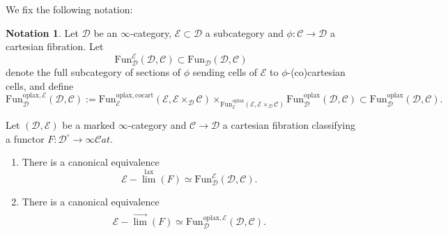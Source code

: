 \documentclass[10pt,oneside]{article}
\numberwithin{equation}{section} %
\numberwithin{figure}{section} %
\theoremstyle{plain}
\theoremstyle{definition}
\newtheorem{notation}[thm]{Notation}
\newcommand{\mC}{{\mathcal C}}
\newcommand{\mD}{{\mathcal D}}
\newcommand{\mE}{{\mathcal E}}
\newcommand{\Fun}{\mathrm{Fun}}
\newcommand{\cocart}{{\mathrm{cocart}}}
\newcommand{\lax}{{\mathrm{lax}}}
\newcommand{\oplax}{{\mathrm{oplax}}}
\newcommand{\scat}{\mathcal{C}\mathit{at}}
\begin{document}
We fix the following notation:

\begin{notation}
Let $\mD$ be an $\infty$-category, $\mE \subset \mD$ a subcategory and $\phi: \mC \to \mD$ a cartesian fibration. 
Let $$ \Fun^{\mE}_\mD(\mD,\mC) \subset \Fun_\mD(\mD,\mC) $$
denote the full subcategory of sections of $\phi$ sending cells of $\mE$ to
$\phi$-(co)cartesian cells, and define
$$ \Fun^{\oplax, \mE}_\mD(\mD,\mC):= \Fun^{\oplax, \cocart}_\mE(\mE,\mE \times_\mD \mC) \times_{\Fun^\oplax_\mE(\mE,\mE \times_\mD \mC)} \Fun^\oplax_\mD(\mD,\mC) \subset \Fun^\oplax_\mD(\mD,\mC). $$
    
\end{notation}

\begin{theorem}\label{limsect} Let $(\mD,\mE)$ be a marked $\infty$-category and $\mC \to \mD$ a cartesian fibration classifying a functor $F: \mD^\circ \to \infty\scat$.

\begin{enumerate}[\normalfont(1)]\setlength{\itemsep}{-2pt}
\item There is a canonical equivalence
$$ \mE-\overset{\lax}{\lim}(F) \simeq \Fun^{\mE}_\mD(\mD,\mC).$$ 

\item There is a canonical equivalence
$$ \mE-\overset{\bar{\to}}{\lim}(F) \simeq \Fun^{\oplax,\mE}_\mD(\mD,\mC).$$ 

\end{enumerate}

\end{theorem}
\end{document}
